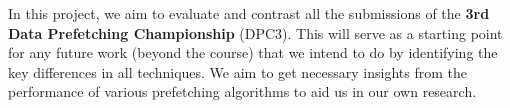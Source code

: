 

In this project, we aim to evaluate and contrast all the submissions of the \textbf{3rd Data Prefetching
Championship} (DPC3). This will serve as a starting point for any future work (beyond the course) that we intend to 
do by identifying the key differences in all techniques. We aim to get necessary insights from the 
performance of various prefetching algorithms to aid us in our own research.

